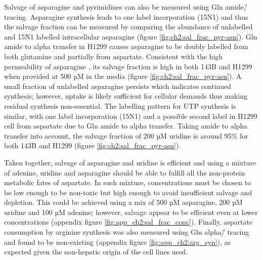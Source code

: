 Salvage of asparagine and pyrimidines can also be measured using Gln amide\=/\hNi{} tracing.
Asparagine synthesis leads to one label incorporation (15N1) and thus the salvage fraction can be measured by comparing the abundance of unlabelled and 15N1 labelled intracellular asparagine (figure \ref{fig:ch2:sal_frac_pyr-asn}).
Gln amide to alpha \hNi{} transfer in H1299 causes asparagine to be doubly labelled from both glutamine and partially from aspartate.
Consistent with the high permeability of asparagine \cite{Sullivan2018-gz}, its salvage fraction is high in both 143B and H1299 when provided at 500 µM in the media (figure \ref{fig:ch2:sal_frac_pyr-asn}).
A small fraction of unlabelled asparagine persists which indicates continued synthesis; however, uptake is likely sufficient for cellular demands thus making residual synthesis non-essential.
The labelling pattern for UTP synthesis is similar, with one label incorporation (15N1) and a possible second label in H1299 cell from aspartate due to Gln amide to alpha \hNi{} transfer.
Taking amide to alpha \hNi{} transfer into account, the salvage fraction of 200 µM uridine is around 95\% for both 143B and H1299 (figure \ref{fig:ch2:sal_frac_pyr-asn}).

Taken together, salvage of asparagine and uridine is efficient and using a mixture of adenine, uridine and asparagine should be able to fulfill all the non-protein metabolic fates of aspartate.
In such mixture, concentrations must be chosen to be low enough to be non-toxic but high enough to avoid insufficient salvage and depletion.
This could be achieved using a mix of 500 µM asparagine, 200 µM uridine and 100 µM adenine; however, salvage appear to be efficient even at lower concentrations (appendix figure \ref{fig:app_ch2:sal_frac_conc}).
Finally, aspartate consumption by arginine synthesis was also measured using Gln alpha\=/\hNi{} tracing and found to be non-existing (appendix figure \ref{fig:app_ch2:arg_syn}), as expected given the non-hepatic origin of the cell lines used.


